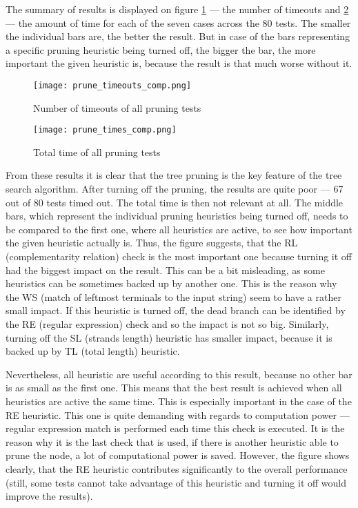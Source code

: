 The summary of results is displayed on figure \ref{fig:prune_timeouts_comp} --- the number of timeouts and \ref{fig:prune_times_comp} --- the amount of time for each of the seven cases across the 80 tests. The smaller the individual bars are, the better the result. But in case of the bars representing a specific pruning heuristic being turned off, the bigger the bar, the more important the given heuristic is, because the result is that much worse without it.

\begin{figure}[h!]
  \centering
  \texttt{[image: prune\_timeouts\_comp.png]}
  \caption{Number of timeouts of all pruning tests}
  \label{fig:prune_timeouts_comp}
\end{figure}

\begin{figure}[h!]
  \centering
  \texttt{[image: prune\_times\_comp.png]}
  \caption{Total time of all pruning tests}
  \label{fig:prune_times_comp}
\end{figure}


From these results it is clear that the tree pruning is the key feature of the tree search algorithm. After turning off the pruning, the results are quite poor --- 67 out of 80 tests timed out. The total time is then not relevant at all. The middle bars, which represent the individual pruning heuristics being turned off, needs to be compared to the first one, where all heuristics are active, to see how important the given heuristic actually is. Thus, the figure suggests, that the RL (complementarity relation) check is the most important one because turning it off had the biggest impact on the result. This can be a bit misleading, as some heuristics can be sometimes backed up by another one. This is the reason why the WS (match of leftmost terminals to the input string) seem to have a rather small impact. If this heuristic is turned off, the dead branch can be identified by the RE (regular expression) check and so the impact is not so big. Similarly, turning off the SL (strands length) heuristic has smaller impact, because it is backed up by TL (total length) heuristic.

Nevertheless, all heuristic are useful according to this result, because no other bar is as small as the first one. This means that the best result is achieved when all heuristics are active the same time. This is especially important in the case of the RE heuristic. This one is quite demanding with regards to computation power --- regular expression match is performed each time this check is executed. It is the reason why it is the last check that is used, if there is another heuristic able to prune the node, a lot of computational power is saved. However, the figure shows clearly, that the RE heuristic contributes significantly to the overall performance (still, some tests cannot take advantage of this heuristic and turning it off would improve the results).


